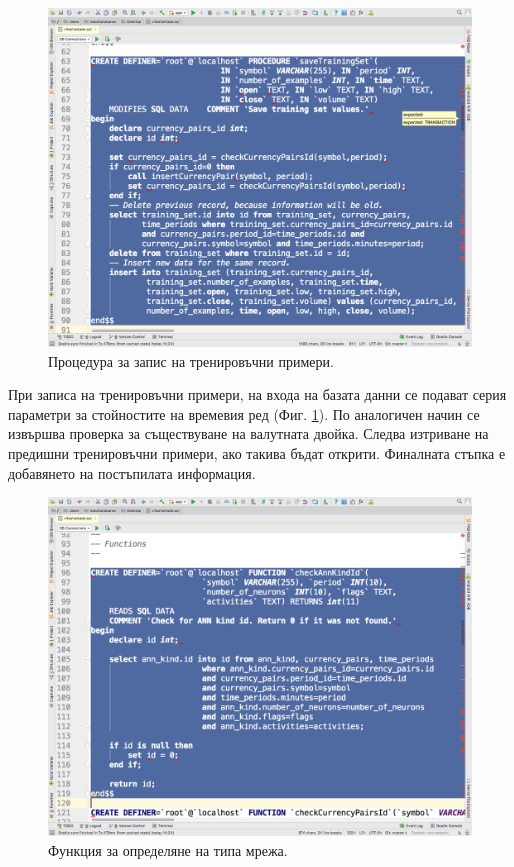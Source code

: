 \documentclass[book,14pt,oneside,openany]{memoir}
\begin{document}
\begin{figure}[h]
  \centering
  \includegraphics[height=0.45\pdfpageheight]{pic0106}
  \caption{Процедура за запис на тренировъчни примери.}
\label{fig:pic0106}
\end{figure}
\FloatBarrier

При записа на тренировъчни примери, на входа на базата данни се подават серия параметри за стойностите на времевия ред (Фиг. \ref{fig:pic0106}). По аналогичен начин се извършва проверка за съществуване на валутната двойка. Следва изтриване на предишни тренировъчни примери, ако такива бъдат открити. Финалната стъпка е добавянето на постъпилата информация. 

\begin{figure}[h]
  \centering
  \includegraphics[height=0.45\pdfpageheight]{pic0107}
  \caption{Функция за определяне на типа мрежа.}
\label{fig:pic0107}
\end{figure}
\FloatBarrier
\end{document}
